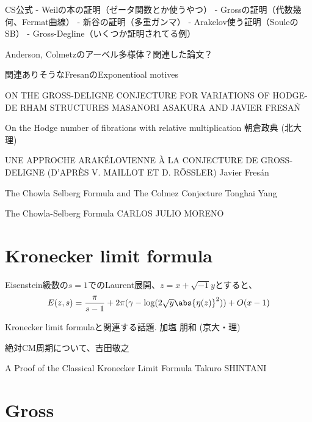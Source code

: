 \documentclass[uplatex, a4paper]{jsbook}
\begin{document}
CS公式
- Weilの本の証明（ゼータ関数とか使うやつ）
- Grossの証明（代数幾何、Fermat曲線）
- 新谷の証明（多重ガンマ）
- Arakelov使う証明（SouleのSB）
- Gross-Degline（いくつか証明されてる例）

Anderson, Colmetzのアーベル多様体？関連した論文？

関連ありそうなFresanのExponentioal motives

ON THE GROSS-DELIGNE CONJECTURE
FOR VARIATIONS OF HODGE-DE RHAM STRUCTURES
MASANORI ASAKURA AND JAVIER FRESA\'N

On the Hodge number of fibrations with relative multiplication
朝倉政典 (北大理)

UNE APPROCHE ARAK\'ELOVIENNE \`A LA CONJECTURE DE GROSS-DELIGNE
(D'APR\`ES V. MAILLOT ET D. R\"OSSLER)
Javier Fres\'an

The Chowla Selberg Formula and The Colmez Conjecture
Tonghai Yang

The Chowla-Selberg Formula CARLOS JULIO MORENO

\section{Kronecker limit formula}
Eisenstein級数の$s=1$でのLaurent展開、$z=x+\sqrt{-1}y$とすると、
\begin{align*}
E(z,s)=\frac{\pi}{s-1}+2\pi(\gamma-\log(2\sqrt{y}\abs{\eta(z)}^2))+O(x-1)
\end{align*}

Kronecker limit formulaと関連する話題. 加塩 朋和 (京大・理)

絶対CM周期について、吉田敬之


A Proof of the Classical Kronecker Limit Formula
Takuro SHINTANI

\section{Gross}
\end{document}
